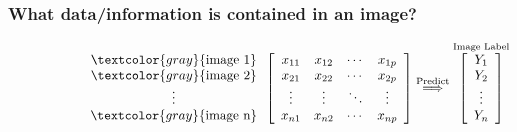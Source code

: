 \documentclass[xcolor={dvipsnames}]{beamer}
\begin{document}
{\begin{figure}
\vspace{.02in}

\end{figure}
\vspace{2in}

}




\frame
{
\frametitle{What data/information is contained in an image?}

$$\hspace{2cm}\begin{array}{c}\textcolor{gray}{\text{image 1}}\\\textcolor{gray}{\text{image 2}}\\\vdots\\\textcolor{gray}{\text{image n}}\\\end{array} \left[\begin{array}{cccc} x_{11} & x_{12} &\cdots & x_{1p}\\ x_{21} & x_{22} &\cdots & x_{2p}\\ \vdots & \vdots & \ddots &\vdots \\ x_{n1} & x_{n2} &\cdots & x_{np}\\\end{array}\right]
\overset{\text{Predict}}{\Longrightarrow} \overset{\text{Image Label}}{\left[\begin{array}{c}Y_1\\Y_2\\\vdots\\Y_n\\\end{array} \right]}
$$



\begin{columns}
\begin{column}{.15\textwidth}
\\


\end{column}
\end{columns}}
\end{document}
